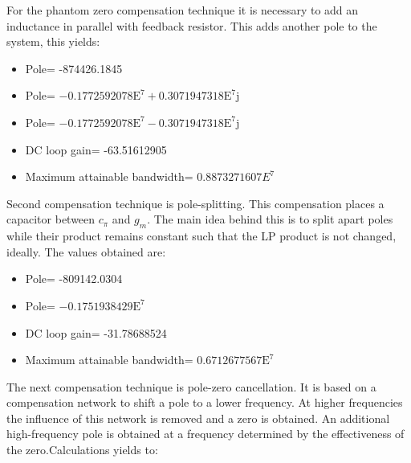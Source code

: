 \documentclass[conference]{IEEEtran}
\begin{document}
For the phantom zero compensation technique it is necessary to add an inductance in parallel with feedback resistor. This adds another pole to the system, this yields:

\begin{itemize}
\item Pole= -874426.1845
\item Pole= $-0.1772592078\text{E}^7+0.3071947318\text{E}^7\text{j}$
\item Pole= $-0.1772592078\text{E}^7-0.3071947318\text{E}^7\text{j}$
\item DC loop gain= -63.51612905
\item Maximum attainable bandwidth= $0.8873271607E^7$
\end{itemize}


Second compensation technique is pole-splitting. This compensation places a capacitor between $c_\pi$ and $g_m$. The main idea behind this is to split apart poles while their product remains constant such that the LP product is not changed, ideally. The values obtained are:

\begin{itemize}
\item Pole= -809142.0304
\item Pole= $-0.1751938429\text{E}^7$
\item DC loop gain= -31.78688524
\item Maximum attainable bandwidth= $0.6712677567\text{E}^7$
\end{itemize}


The next compensation technique is pole-zero cancellation. It is based on a compensation network to shift a pole to a lower frequency. At higher frequencies the influence of this network is removed and a zero is obtained. An additional high-frequency pole is obtained at a frequency determined by the effectiveness of the zero.Calculations yields to:
\end{document}
